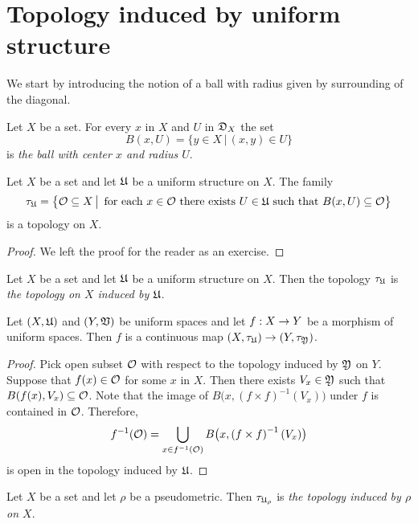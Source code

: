 \section{Topology induced by uniform structure}
\noindent
We start by introducing the notion of a ball with radius given by surrounding of the diagonal.

\begin{definition}
Let $X$ be a set. For every $x$ in $X$ and $U$ in ${\mathfrak D}_X$ the set
$$B(x,U) = \big\{y\in X\,\big|\,(x,y)\in U\big\}$$
is \textit{the ball with center $x$ and radius $U$}.
\end{definition}

\begin{fact}\label{fact:topology_induced_by_uniform_structure}
Let $X$ be a set and let ${\mathfrak U}$ be a uniform structure on $X$. The family
$$\tau_{{\mathfrak U}} = \big\{{\mathcal O}\subseteq X\,\big|\,\mbox{ for each }x\in {\mathcal O}\mbox{ there exists }U\in {\mathfrak U}\mbox{ such that }B(x,U)\subseteq {\mathcal O}\big\}$$
is a topology on $X$.
\end{fact}
\begin{proof}
We left the proof for the reader as an exercise.
\end{proof}

\begin{definition}
Let $X$ be a set and let ${\mathfrak U}$ be a uniform structure on $X$. Then the topology $\tau_{{\mathfrak U}}$ is \textit{the topology on $X$ induced by ${\mathfrak U}$}.
\end{definition}

\begin{fact}\label{fact:uniform_morphism_is_a_continuous_map}
Let $(X,{\mathfrak U})$ and $(Y,{\mathfrak V})$ be uniform spaces and let $f:X\rightarrow Y$ be a morphism of uniform spaces. Then $f$ is a continuous map $\left(X,\tau_{{\mathfrak U}}\right)\rightarrow \left(Y,\tau_{{\mathfrak Y}}\right)$.
\end{fact}
\begin{proof}
Pick open subset ${\mathcal O}$ with respect to the topology induced by ${\mathfrak Y}$ on $Y$. Suppose that $f(x) \in {\mathcal O}$ for some $x$ in $X$. Then there exists $V_x \in {\mathfrak Y}$ such that $B(f(x),V_x)\subseteq {\mathcal O}$. Note that the image of $B\big(x,\left(f\times f\right)^{-1}(V_x)\big)$ under $f$ is contained in ${\mathcal O}$. Therefore,
$$f^{-1}({\mathcal O}) = \bigcup_{x\in f^{-1}({\mathcal O})}B\big(x,\left(f\times f\right)^{-1}(V_x)\big)$$
is open in the topology induced by ${\mathfrak U}$.
\end{proof}

\begin{definition}
Let $X$ be a set and let $\rho$ be a pseudometric. Then $\tau_{{\mathfrak U}_{\rho}}$ is \textit{the topology induced by $\rho$ on $X$}.
\end{definition}

